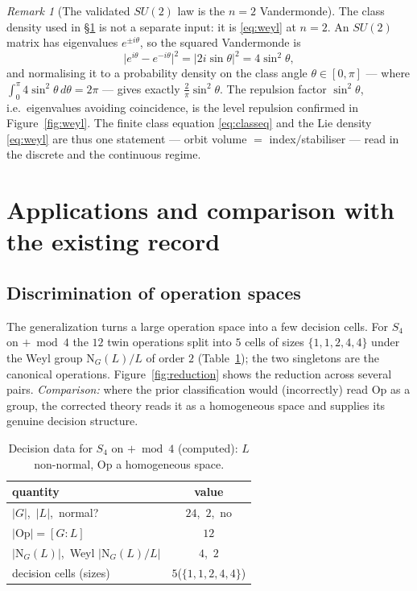 \documentclass[11pt,a4paper]{article}
\newcommand{\Op}{\mathrm{Op}}
\newcommand{\Norm}{\mathrm{N}}
\theoremstyle{plain}
\theoremstyle{definition}
\theoremstyle{remark}
\newtheorem{remark}[theorem]{Remark}
\begin{document}
\begin{remark}[The validated $SU(2)$ law is the $n=2$ Vandermonde]\label{rem:su2-weyl}
The class density used in \S\ref{sec:apps} is not a separate input: it is \eqref{eq:weyl} at $n=2$. An $SU(2)$
matrix has eigenvalues $e^{\pm i\theta}$, so the squared Vandermonde is
\[
\bigl|e^{i\theta}-e^{-i\theta}\bigr|^2=\bigl|2i\sin\theta\bigr|^2=4\sin^2\theta,
\]
and normalising it to a probability density on the class angle $\theta\in[0,\pi]$ --- where
$\int_0^\pi 4\sin^2\theta\,d\theta=2\pi$ --- gives exactly $\tfrac{2}{\pi}\sin^2\theta$. The repulsion factor
$\sin^2\theta$, i.e.\ eigenvalues avoiding coincidence, is the level repulsion confirmed in
Figure~\ref{fig:weyl}. The finite class equation \eqref{eq:classeq} and the Lie density \eqref{eq:weyl} are thus
one statement --- orbit volume $=$ index$/$stabiliser --- read in the discrete and the continuous regime.
\end{remark}

\section{Applications and comparison with the existing record}
\label{sec:apps}

\subsection{Discrimination of operation spaces}

The generalization turns a large operation space into a few decision cells.
For $S_4$ on $+\bmod 4$ the $12$ twin operations split into $5$ cells of sizes
$\{1,1,2,4,4\}$ under the Weyl group $\Norm_G(L)/L$ of order $2$
(Table~\ref{tab:s4}); the two singletons are the canonical operations.
Figure~\ref{fig:reduction} shows the reduction across several pairs.
\emph{Comparison:} where the prior classification would (incorrectly) read
$\Op$ as a group, the corrected theory reads it as a homogeneous space and
supplies its genuine decision structure.

\begin{table}[ht]
\centering
\caption{Decision data for $S_4$ on $+\bmod 4$ (computed): $L$ non-normal,
$\Op$ a homogeneous space.}
\label{tab:s4}
\begin{tabular}{lc}
\toprule
quantity & value \\
\midrule
$|G|$,\ $|L|$,\ normal? & $24$,\ $2$,\ no \\
$|\Op|=[G:L]$ & $12$ \\
$|\Norm_G(L)|$,\ Weyl $|\Norm_G(L)/L|$ & $4$,\ $2$ \\
decision cells (sizes) & $5$\quad($\{1,1,2,4,4\}$) \\
\bottomrule
\end{tabular}
\end{table}
\end{document}
